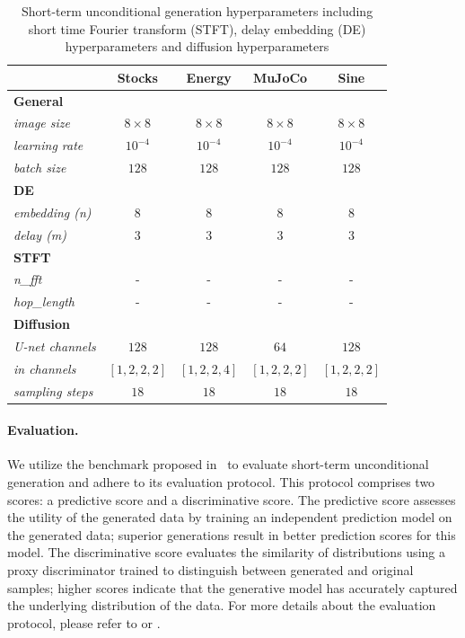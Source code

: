 \documentclass{article}
\begin{document}
\begin{table}[!ht]
    \centering
    \caption{Short-term unconditional generation hyperparameters including short time Fourier transform (STFT), delay embedding (DE) hyperparameters and diffusion hyperparameters}
    \label{tab:hp_short}
    \setlength{\tabcolsep}{8pt} %
    \begin{tabular}{lcccc}
        \toprule
        & \textbf{Stocks} & \textbf{Energy} & \textbf{MuJoCo} & \textbf{Sine} \\
        \midrule
        \textbf{General} \\
        \emph{image size} & $8 \times 8$ & $8 \times 8$ & $8 \times 8$ & $8 \times 8$ \\
        \emph{learning rate} & $10^{-4}$ & $10^{-4}$ & $10^{-4}$ & $10^{-4}$ \\
        \emph{batch size} & $128$ & $128$ & $128$ & $128$ \\
        \midrule
        \textbf{DE} \\
        \emph{embedding (n)} & $8$ & $8$ & $8$ & $8$  \\
        \emph{delay (m)} & $3$ & $3$ & $3$ & $3$\\
        \midrule
        \textbf{STFT} \\
        \emph{n\_fft} & - & - & - & - \\
        \emph{hop\_length} & - & - & - & - \\
        \midrule
        \textbf{Diffusion} \\
        \emph{U-net channels} & $128$ & $128$ & $64$  & $128$\\
        \emph{in channels} & $[1, 2, 2, 2]$ & $[1, 2, 2, 4]$ & $[1, 2, 2, 2]$ & $[1, 2, 2, 2]$\\
        \emph{sampling steps} & $18$ & $18$ & $18$ & $18$ \\
        \bottomrule
    \end{tabular}
\end{table}

\paragraph{Evaluation.} We utilize the benchmark proposed in~\cite{yoon2019time} to evaluate short-term unconditional generation and adhere to its evaluation protocol. This protocol comprises two scores: a predictive score and a discriminative score. The predictive score assesses the utility of the generated data by training an independent prediction model on the generated data; superior generations result in better prediction scores for this model. The discriminative score evaluates the similarity of distributions using a proxy discriminator trained to distinguish between generated and original samples; higher scores indicate that the generative model has accurately captured the underlying distribution of the data. For more details about the evaluation protocol, please refer to \cite{coletta2024constrained} or \cite{yoon2019time}.
\end{document}
